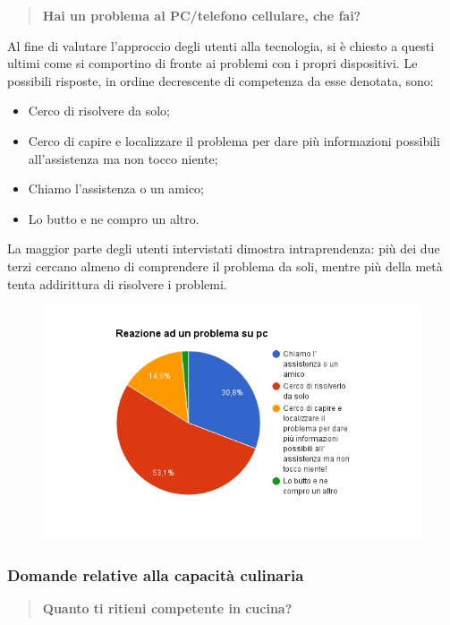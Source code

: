 \begin{quote}
	\textbf{Hai un problema al PC/telefono cellulare, che fai?}
\end{quote}

Al fine di valutare l'approccio degli utenti alla tecnologia, si è 
chiesto a questi ultimi come si comportino di fronte ai problemi con
i propri dispositivi. Le possibili risposte, in ordine decrescente di competenza da esse denotata, sono:
\begin{itemize}
 \item Cerco di risolvere da solo;
 \item Cerco di capire e localizzare il problema per dare più informazioni possibili all'assistenza ma non tocco niente;
 \item Chiamo l'assistenza o un amico;
 \item Lo butto e ne compro un altro.
\end{itemize}

La maggior parte degli utenti intervistati dimostra intraprendenza: più dei due terzi cercano almeno di comprendere
il problema da soli, mentre più della metà tenta addirittura di risolvere i problemi.

\begin{figure}[H]
	\centering
	\includegraphics[scale=0.6]{img/chart_reazione_problema_pc}
\end{figure}

\subsubsection{Domande relative alla capacità culinaria}

\begin{quote}
	\textbf{Quanto ti ritieni competente in cucina?}
\end{quote}

